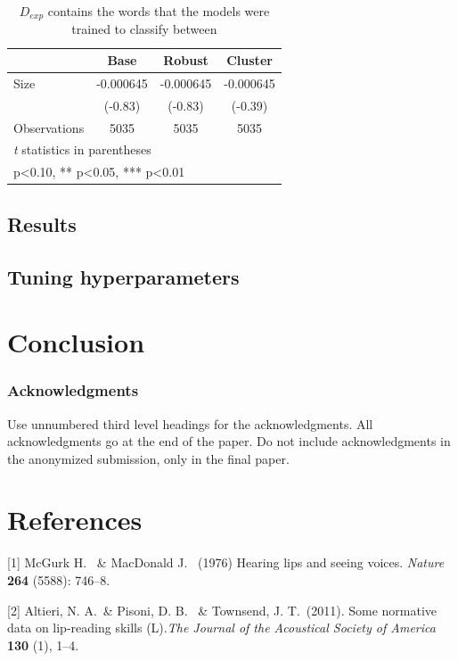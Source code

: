 \documentclass{article}
\begin{document}
\begin{table}[htbp]\centering
\def\sym#1{\ifmmode^{#1}\else\(^{#1}\)\fi}
\caption{$D_{exp}$ contains the words that the models were trained to classify between}
\begin{tabular}{l*{3}{c}}
\toprule
                  &     Base   &   Robust   &  Cluster \\
\midrule
Size            &-0.000645   &-0.000645   &-0.000645   \\
                &  (-0.83)   &  (-0.83)   &  (-0.39)   \\
\midrule
Observations    &     5035   &     5035   &     5035   \\
\bottomrule
\multicolumn{4}{l}{\footnotesize \textit{t} statistics in parentheses}\\
\multicolumn{4}{l}{\footnotesize * p<0.10, ** p<0.05, *** p<0.01}\\
\end{tabular}
\end{table}

\subsection{Results}

\subsection{Tuning hyperparameters}

\section{Conclusion}

\subsubsection*{Acknowledgments}

Use unnumbered third level headings for the acknowledgments. All acknowledgments
go at the end of the paper. Do not include acknowledgments in the anonymized
submission, only in the final paper.

\section*{References}
\small

[1] McGurk H. \ \& MacDonald J. \ (1976) Hearing lips and seeing voices. {\it Nature} {\bf 264} (5588): 746–8.

[2] Altieri, N. A.\ \& Pisoni, D. B. \ \& Townsend, J. T.\  (2011). Some normative data on lip-reading skills (L).{\it The Journal of the Acoustical Society of America}  {\bf 130} (1), 1–4.
\end{document}
